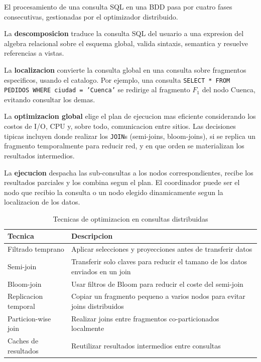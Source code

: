 \documentclass[11pt,a4paper]{article}
\begin{document}
El procesamiento de una consulta SQL en una BDD pasa por cuatro fases consecutivas, gestionadas por el optimizador distribuido.

La \textbf{descomposicion} traduce la consulta SQL del usuario a una expresion del algebra relacional sobre el esquema global, valida sintaxis, semantica y resuelve referencias a vistas.

La \textbf{localizacion} convierte la consulta global en una consulta sobre fragmentos especificos, usando el catalogo. Por ejemplo, una consulta \texttt{SELECT * FROM PEDIDOS WHERE ciudad = 'Cuenca'} se redirige al fragmento $F_1$ del nodo Cuenca, evitando consultar los demas.

La \textbf{optimizacion global} elige el plan de ejecucion mas eficiente considerando los costos de I/O, CPU y, sobre todo, comunicacion entre sitios. Las decisiones tipicas incluyen donde realizar los \texttt{JOIN}s (semi-joins, bloom-joins), si se replica un fragmento temporalmente para reducir red, y en que orden se materializan los resultados intermedios.

La \textbf{ejecucion} despacha las sub-consultas a los nodos correspondientes, recibe los resultados parciales y los combina segun el plan. El coordinador puede ser el nodo que recibio la consulta o un nodo elegido dinamicamente segun la localizacion de los datos.

\begin{table}[H]
\centering
\caption{Tecnicas de optimizacion en consultas distribuidas}
\small
\begin{tabular}{lp{7.5cm}}
\toprule
\textbf{Tecnica} & \textbf{Descripcion} \\
\midrule
Filtrado temprano & Aplicar selecciones y proyecciones antes de transferir datos \\
Semi-join & Transferir solo claves para reducir el tamano de los datos enviados en un join \\
Bloom-join & Usar filtros de Bloom para reducir el coste del semi-join \\
Replicacion temporal & Copiar un fragmento pequeno a varios nodos para evitar joins distribuidos \\
Particion-wise join & Realizar joins entre fragmentos co-particionados localmente \\
Caches de resultados & Reutilizar resultados intermedios entre consultas \\
\bottomrule
\end{tabular}
\label{tab:optimizacion}
\end{table}
\end{document}
